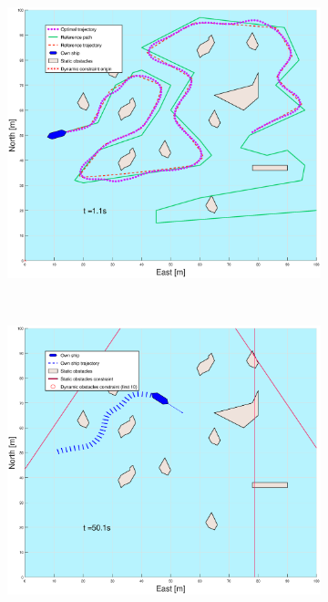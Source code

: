 \begin{figure}[!b]
\begin{subfigure}[b]{0.499\textwidth}
        \includegraphics[width=\textwidth]{Images/Figures/skjergard_u_trafikk/_Simple_1fig999_time=1}
    \end{subfigure}
    \hfill
    \\
    \begin{subfigure}[b]{0.49\textwidth}
        \centering
        \includegraphics[width=\textwidth]{Images/Figures/skjergard_u_trafikk/_Simple_1fig1_time=50}
    \end{subfigure}

\end{figure}
